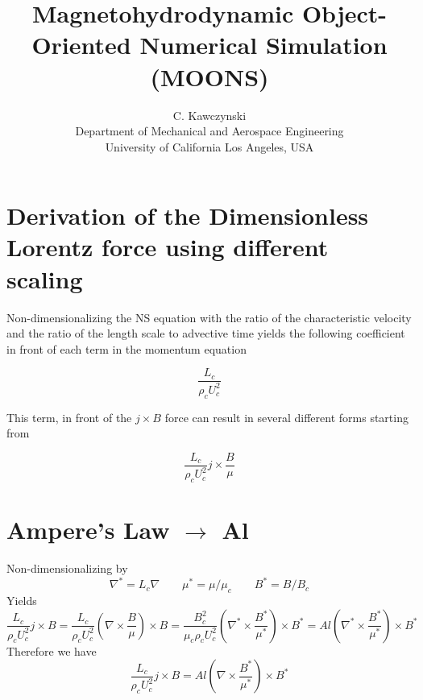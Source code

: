 \documentclass[11pt]{article}
\begin{document}
\doublespacing
\title{Magnetohydrodynamic Object-Oriented Numerical Simulation (MOONS)}
\author{C. Kawczynski \\
Department of Mechanical and Aerospace Engineering \\
University of California Los Angeles, USA\\
}
\maketitle

\section{Derivation of the Dimensionless Lorentz force using different scaling}
Non-dimensionalizing the NS equation with the ratio of the characteristic velocity and the ratio of the length scale to advective time yields the following coefficient in front of each term in the momentum equation

\begin{equation}
	\frac{L_c}{\rho_c U_c^2}
\end{equation}

This term, in front of the $j\times B$ force can result in several different forms starting from

\begin{equation}
	 \frac{L_c}{\rho_c U_c^2} j \times \frac{B}{\mu}
\end{equation}

\section{Ampere's Law \texorpdfstring{$\rightarrow$}{} Al}
Non-dimensionalizing by
\begin{equation}
	\nabla^* = L_c \nabla \qquad
	\mu^* = \mu / \mu_c \qquad
	B^* = B/B_c
\end{equation}
Yields
\begin{equation}
	 \frac{L_c}{\rho_c U_c^2} j \times B
	 =
	 \frac{L_c}{\rho_c U_c^2} \left( \nabla \times \frac{B}{\mu} \right) \times B
	 =
	\frac{B_c^2}{\mu_c \rho_c U_c^2} \left( \nabla^* \times \frac{B^*}{\mu^*} \right) \times B^*
	 =
	Al \left( \nabla^* \times \frac{B^*}{\mu^*} \right) \times B^*
\end{equation}
Therefore we have
\begin{equation}
	\boxed{
	 \frac{L_c}{\rho_c U_c^2} j \times B
	 =
	Al \left( \nabla \times \frac{B^*}{\mu^*} \right) \times B^*
	}
\end{equation}
\end{document}
